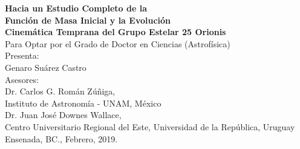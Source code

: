 \documentclass[12pt]{article}
\begin{document}
\vspace*{3mm}
\begin{center}
{\Large \textbf{Hacia un Estudio Completo de la}}\\ \vspace*{2mm}
{\Large \textbf{Funci\'on de Masa Inicial y la Evoluci\'on}}\\ \vspace*{2mm}
{\Large \textbf{Cinem\'atica Temprana del Grupo Estelar 25 Orionis}}\\
\vspace*{10mm}
{\Large Para Optar por el Grado de Doctor en Ciencias (Astrof\'isica)}\\
\vspace*{10mm}
{\Large Presenta:}\\
\vspace*{5mm}
{\Large Genaro Su\'arez Castro}\\
\vspace*{10mm}
{\Large Asesores:}\\
\vspace*{3mm}
{\Large Dr. Carlos G. Rom\'an Z\'u\~niga,} \\ {\large Instituto de Astronom\'ia - UNAM, M\'exico} \\
\vspace*{2mm}
{\Large Dr. Juan Jos\'e Downes Wallace,} \\ {\large Centro Universitario Regional del Este, Universidad de la Rep\'ublica, Uruguay} \\
\vspace*{8mm}
{\Large Ensenada, BC., Febrero, 2019.}
\end{center}
\end{document}
